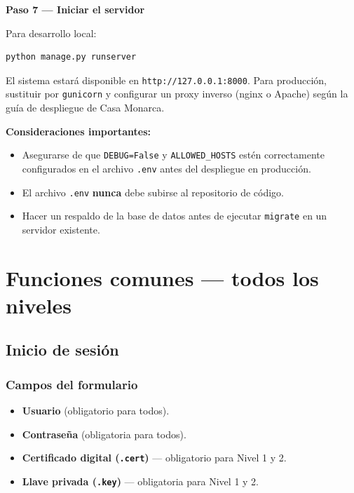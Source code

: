 \documentclass[10pt,letterpaper]{report}
\newcommand{\paratodos}{%
  \par\smallskip\noindent
  \fbox{\small\bfseries\ Todos los niveles\ }%
  \par\medskip}
\newcommand{\paso}[2]{\par\medskip\noindent\textbf{Paso #1 — #2}\par\nopagebreak\smallskip}
\begin{document}
\paso{7}{Iniciar el servidor}

Para desarrollo local:
\begin{lstlisting}[style=cmd]
python manage.py runserver
\end{lstlisting}
El sistema estará disponible en \texttt{http://127.0.0.1:8000}. Para producción, sustituir por \texttt{gunicorn} y configurar un proxy inverso (nginx o Apache) según la guía de despliegue de Casa Monarca.

\begin{nota}
\textbf{Consideraciones importantes:}
\begin{itemize}[leftmargin=*]
  \item Asegurarse de que \texttt{DEBUG=False} y \texttt{ALLOWED\_HOSTS} estén correctamente configurados en el archivo \texttt{.env} antes del despliegue en producción.
  \item El archivo \texttt{.env} \textbf{nunca} debe subirse al repositorio de código.
  \item Hacer un respaldo de la base de datos antes de ejecutar \texttt{migrate} en un servidor existente.
\end{itemize}
\end{nota}

\chapter{Funciones comunes — todos los niveles}
\paratodos

\section{Inicio de sesión}

\subsection*{Campos del formulario}
\begin{itemize}[leftmargin=1.4em]
  \item \textbf{Usuario} (obligatorio para todos).
  \item \textbf{Contraseña} (obligatoria para todos).
  \item \textbf{Certificado digital (\texttt{.cert})} — obligatorio para Nivel 1 y 2.
  \item \textbf{Llave privada (\texttt{.key})} — obligatoria para Nivel 1 y 2.
\end{itemize}
\end{document}
